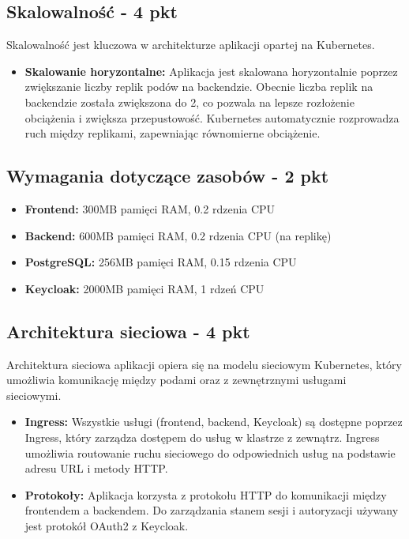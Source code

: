 \documentclass[12pt,a4paper]{article}
\begin{document}
\subsection{Skalowalność - 4 pkt}
\label{sec:ExamplesSection}

Skalowalność jest kluczowa w architekturze aplikacji opartej na Kubernetes.

\begin{itemize}
\item \textbf{Skalowanie horyzontalne:} Aplikacja jest skalowana horyzontalnie poprzez zwiększanie liczby replik podów na backendzie. Obecnie liczba replik na backendzie została zwiększona do 2, co pozwala na lepsze rozłożenie obciążenia i zwiększa przepustowość. Kubernetes automatycznie rozprowadza ruch między replikami, zapewniając równomierne obciążenie.

\end{itemize}

\subsection{Wymagania dotyczące zasobów - 2 pkt}
\label{sec:ExampleTables}

\begin{itemize}
\item \textbf{Frontend:} 300MB pamięci RAM, 0.2 rdzenia CPU
\item \textbf{Backend:} 600MB pamięci RAM, 0.2 rdzenia CPU (na replikę)
\item \textbf{PostgreSQL:} 256MB pamięci RAM, 0.15 rdzenia CPU
\item \textbf{Keycloak:} 2000MB pamięci RAM, 1 rdzeń CPU
\end{itemize}


\subsection{Architektura sieciowa - 4 pkt}
\label{sec:ExampleResults}

Architektura sieciowa aplikacji opiera się na modelu sieciowym Kubernetes, który umożliwia komunikację między podami oraz z zewnętrznymi usługami sieciowymi.

\begin{itemize}
\item \textbf{Ingress:} Wszystkie usługi (frontend, backend, Keycloak) są dostępne poprzez Ingress, który zarządza dostępem do usług w klastrze z zewnątrz. Ingress umożliwia routowanie ruchu sieciowego do odpowiednich usług na podstawie adresu URL i metody HTTP.

\item \textbf{Protokoły:} Aplikacja korzysta z protokołu HTTP do komunikacji między frontendem a backendem. Do zarządzania stanem sesji i autoryzacji używany jest protokół OAuth2 z Keycloak.

\end{itemize}

\nocite{*}
\end{document}
